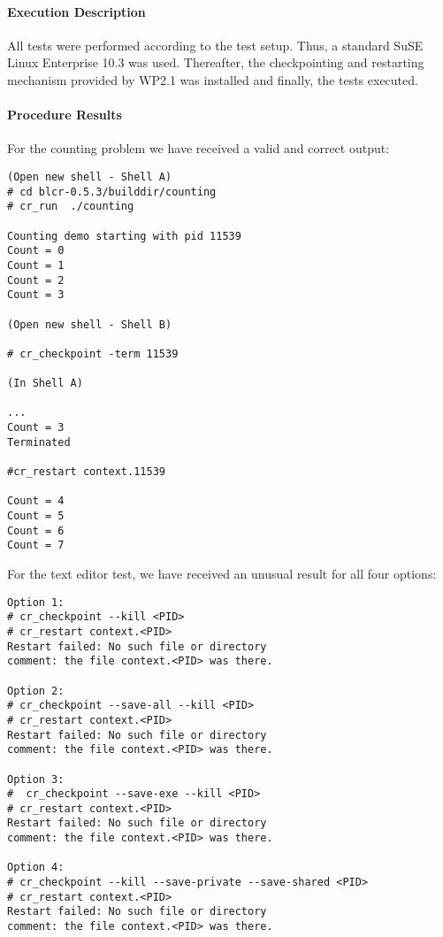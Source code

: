 \paragraph{Execution Description}
All tests were performed according to the test setup. Thus, a standard SuSE Linux Enterprise 10.3 was used. Thereafter, the checkpointing and restarting mechanism provided by WP2.1 was installed and finally, the tests executed.

\paragraph{Procedure Results}
For the counting problem we have received a valid and correct output:
\begin{lstlisting}
(Open new shell - Shell A)
# cd blcr-0.5.3/builddir/counting
# cr_run  ./counting

Counting demo starting with pid 11539
Count = 0
Count = 1
Count = 2
Count = 3

(Open new shell - Shell B)

# cr_checkpoint -term 11539 

(In Shell A)

... 
Count = 3
Terminated

#cr_restart context.11539

Count = 4
Count = 5
Count = 6
Count = 7
\end{lstlisting}

For the text editor test, we have received an unusual result for all four options:
\begin{lstlisting}
Option 1:
# cr_checkpoint --kill <PID>
# cr_restart context.<PID>
Restart failed: No such file or directory
comment: the file context.<PID> was there.

Option 2:
# cr_checkpoint --save-all --kill <PID>
# cr_restart context.<PID>
Restart failed: No such file or directory
comment: the file context.<PID> was there.

Option 3:
#  cr_checkpoint --save-exe --kill <PID>
# cr_restart context.<PID>
Restart failed: No such file or directory
comment: the file context.<PID> was there.

Option 4:
# cr_checkpoint --kill --save-private --save-shared <PID>
# cr_restart context.<PID>
Restart failed: No such file or directory
comment: the file context.<PID> was there.
\end{lstlisting}

